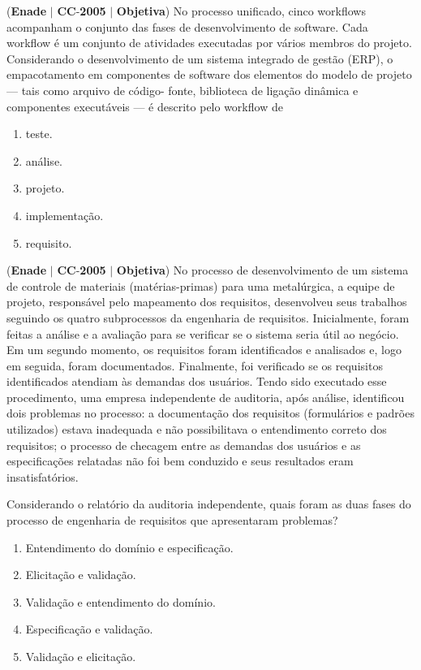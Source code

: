 \documentclass{exam}
\begin{document}
\begin{questions}
\question (\textbf{Enade} $|$ \textbf{CC}-\textbf{2005} $|$ \textbf{Objetiva})
No processo unificado, cinco workflows acompanham o conjunto
das fases de desenvolvimento de software. Cada workflow é um
conjunto de atividades executadas por vários membros do projeto.
Considerando o desenvolvimento de um sistema integrado de
gestão (ERP), o empacotamento em componentes de software dos
elementos do modelo de projeto — tais como arquivo de código-
fonte, biblioteca de ligação dinâmica e componentes executáveis
— é descrito pelo workflow de
	\begin{enumerate}[label=\alph*)]
		\item  teste.
		\item  análise.
		\item  projeto.
		\item  implementação.
		\item  requisito.
	\end{enumerate}

\question (\textbf{Enade} $|$ \textbf{CC}-\textbf{2005} $|$ \textbf{Objetiva})
No processo de desenvolvimento de um sistema de
controle de materiais (matérias-primas) para uma
metalúrgica, a equipe de projeto, responsável pelo
mapeamento dos requisitos, desenvolveu seus trabalhos
seguindo os quatro subprocessos da engenharia de
requisitos. Inicialmente, foram feitas a análise e a avaliação
para se verificar se o sistema seria útil ao negócio. Em um
segundo momento, os requisitos foram identificados e
analisados e, logo em seguida, foram documentados.
Finalmente, foi verificado se os requisitos identificados
atendiam às demandas dos usuários. Tendo sido executado
esse procedimento, uma empresa independente de
auditoria, após análise, identificou dois problemas no
processo: a documentação dos requisitos (formulários e
padrões utilizados) estava inadequada e não possibilitava
o entendimento correto dos requisitos; o processo de
checagem entre as demandas dos usuários e as
especificações relatadas não foi bem conduzido e seus
resultados eram insatisfatórios.

Considerando o relatório da auditoria independente, quais foram
as duas fases do processo de engenharia de requisitos que
apresentaram problemas?
	\begin{enumerate}[label=\alph*)]
		\item  Entendimento do domínio e especificação.
		\item  Elicitação e validação.
		\item  Validação e entendimento do domínio.
		\item  Especificação e validação.
		\item  Validação e elicitação.
	\end{enumerate}


\end{questions}
\end{document}
